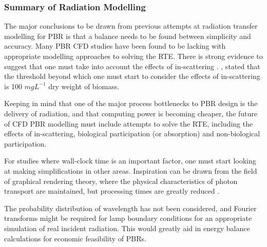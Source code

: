 

\subsubsection{Summary of Radiation Modelling}
The major conclusions to be drawn from previous attempts at radiation transfer modelling for PBR is that a balance needs to be found between simplicity and accuracy. Many PBR CFD studies have been found to be lacking with appropriate modelling approaches to solving the RTE. There is strong evidence to suggest that one must take into account the effects of in-scattering \cite{Heinrich2012,Kong2014,Modest2003,Krishnamoorthy2014,Lee2014,Gao2016}. \cite{Heinrich2012}, stated that the threshold beyond which one must start to consider the effects of in-scattering is 100 $mg L^{-1}$ dry weight of biomass. 
\skippingparagraph

Keeping in mind that one of the major process bottlenecks to PBR design is the delivery of radiation, and that computing power is becoming cheaper, the future of CFD PBR modelling must include attempts to solve the RTE, including the effects of in-scattering, biological participation (or absorption) and non-biological participation. 
\skippingparagraph

For studies where wall-clock time is an important factor, one must start looking at making simplifications in other areas. Inspiration can be drawn from the field of graphical rendering theory, where the physical characteristics of photon transport are maintained, but processing times are greatly reduced \cite{Jarosz2008}.
\skippingparagraph

The probability distribution of wavelength has not been considered, and Fourier transforms might be required for lamp boundary conditions for an appropriate simulation of real incident radiation. This would greatly aid in energy balance calculations for economic feasibility of PBRs. 

